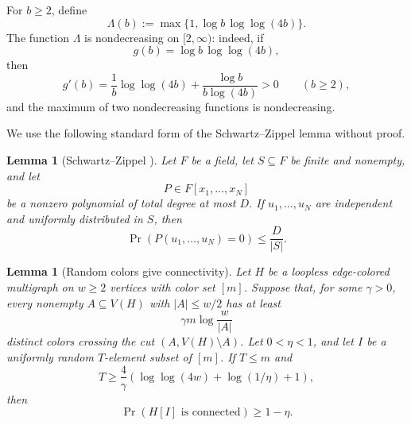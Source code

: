 \documentclass{amsart}
\newtheorem{lemma}[theorem]{Lemma}
\theoremstyle{definition}
\theoremstyle{remark}
\begin{document}
For \(b\ge 2\), define
\[
\Lambda(b):=\max\{1,\log b\,\log\log(4b)\}.
\]
The function \(\Lambda\) is nondecreasing on \([2,\infty)\): indeed, if
\[
g(b)=\log b\,\log\log(4b),
\]
then
\[
g'(b)=\frac{1}{b}\log\log(4b)+\frac{\log b}{b\log(4b)}>0
\qquad(b\ge2),
\]
and the maximum of two nondecreasing functions is nondecreasing.

We use the following standard form of the Schwartz--Zippel lemma without proof.

\begin{lemma}[Schwartz--Zippel \cite{Schwartz,Zippel}]\label{lem:schwartz-zippel}
Let \(F\) be a field, let \(S\subseteq F\) be finite and nonempty, and let
\[
P\in F[x_1,\ldots,x_N]
\]
be a nonzero polynomial of total degree at most \(D\). If \(u_1,\ldots,u_N\) are independent and uniformly distributed in \(S\), then
\[
\Pr(P(u_1,\ldots,u_N)=0)\le \frac{D}{|S|}.
\]
\end{lemma}

\begin{lemma}[Random colors give connectivity]\label{lem:random-colors}
Let \(H\) be a loopless edge-colored multigraph on \(w\ge2\) vertices with color set \([m]\). Suppose that, for some \(\gamma>0\), every nonempty \(A\subseteq V(H)\) with \(|A|\le w/2\) has at least
\[
\gamma m\log\frac{w}{|A|}
\]
distinct colors crossing the cut \((A,V(H)\setminus A)\). Let \(0<\eta<1\), and let \(I\) be a uniformly random \(T\)-element subset of \([m]\). If \(T\le m\) and
\[
T\ge \frac4\gamma\left(\log\log(4w)+\log(1/\eta)+1\right),
\]
then
\[
\Pr(H[I]\text{ is connected})\ge 1-\eta.
\]
\end{lemma}
\end{document}
